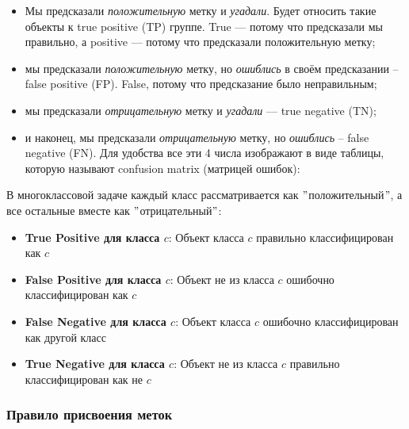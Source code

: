\begin{itemize}
    \item Мы предсказали \textit{положительную} метку и \textit{угадали}.
    Будет относить такие объекты к true positive (TP) группе.
    True — потому что предсказали мы правильно, а positive — потому что предсказали положительную метку;
    \item мы предсказали \textit{положительную} метку, но \textit{ошиблись} в своём предсказании -- false
    positive (FP).
    False, потому что предсказание было неправильным;
    \item мы предсказали \textit{отрицательную} метку и \textit{угадали} — true negative (TN);
    \item и наконец, мы предсказали \textit{отрицательную} метку, но \textit{ошиблись} -- false negative (FN).
    Для удобства все эти 4 числа изображают в виде таблицы, которую называют confusion matrix (матрицей ошибок):
\end{itemize}

В многоклассовой задаче каждый класс рассматривается как \("\)положительный\("\), а все остальные вместе как
\("\)отрицательный\("\):

\begin{itemize}
    \item \textbf{True Positive для класса $c$}: Объект класса $c$ правильно классифицирован как $c$
    \item \textbf{False Positive для класса $c$}: Объект не из класса $c$ ошибочно классифицирован как $c$
    \item \textbf{False Negative для класса $c$}: Объект класса $c$ ошибочно классифицирован как другой класс
    \item \textbf{True Negative для класса $c$}: Объект не из класса $c$ правильно классифицирован как не $c$
\end{itemize}

\subsubsection{Правило присвоения меток}

